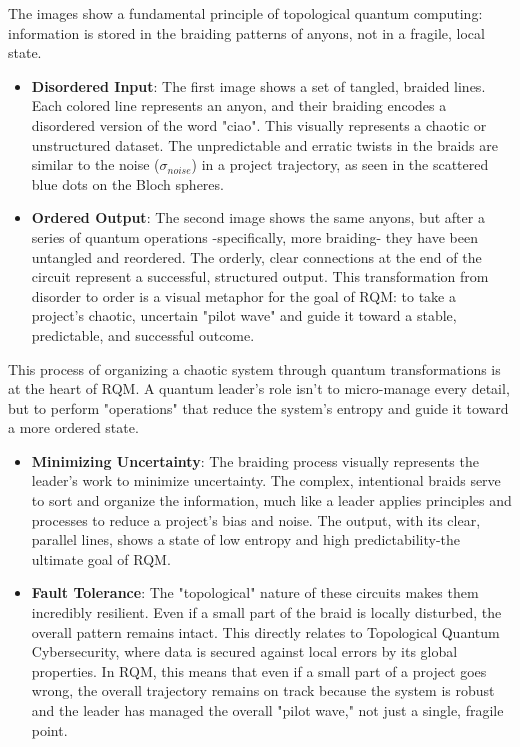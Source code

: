 \documentclass{article}
\begin{document}
The images show a fundamental principle of topological quantum computing: information is stored in the braiding patterns of anyons, not in a fragile, local state.
\begin{itemize}
\item \textbf{Disordered Input}: The first image shows a set of tangled, braided lines. Each colored line represents an anyon, and their braiding encodes a disordered version of the word "ciao". This visually represents a chaotic or unstructured dataset. The unpredictable and erratic twists in the braids are similar to the noise ($\sigma_{noise}$) in a project trajectory, as seen in the scattered blue dots on the Bloch spheres.
\item \textbf{Ordered Output}: The second image shows the same anyons, but after a series of quantum operations -specifically, more braiding- they have been untangled and reordered. The orderly, clear connections at the end of the circuit represent a successful, structured output. This transformation from disorder to order is a visual metaphor for the goal of RQM: to take a project's chaotic, uncertain "pilot wave" and guide it toward a stable, predictable, and successful outcome.
\end{itemize}


This process of organizing a chaotic system through quantum transformations is at the heart of RQM. A quantum leader's role isn't to micro-manage every detail, but to perform "operations" that reduce the system's entropy and guide it toward a more ordered state.
\begin{itemize}
\item \textbf{Minimizing Uncertainty}: The braiding process visually represents the leader's work to minimize uncertainty. The complex, intentional braids serve to sort and organize the information, much like a leader applies principles and processes to reduce a project's bias and noise. The output, with its clear, parallel lines, shows a state of low entropy and high predictability-the ultimate goal of RQM.
\item \textbf{Fault Tolerance}: The "topological" nature of these circuits makes them incredibly resilient. Even if a small part of the braid is locally disturbed, the overall pattern remains intact. This directly relates to Topological Quantum Cybersecurity, where data is secured against local errors by its global properties. In RQM, this means that even if a small part of a project goes wrong, the overall trajectory remains on track because the system is robust and the leader has managed the overall "pilot wave," not just a single, fragile point.
\end{itemize}
\end{document}

